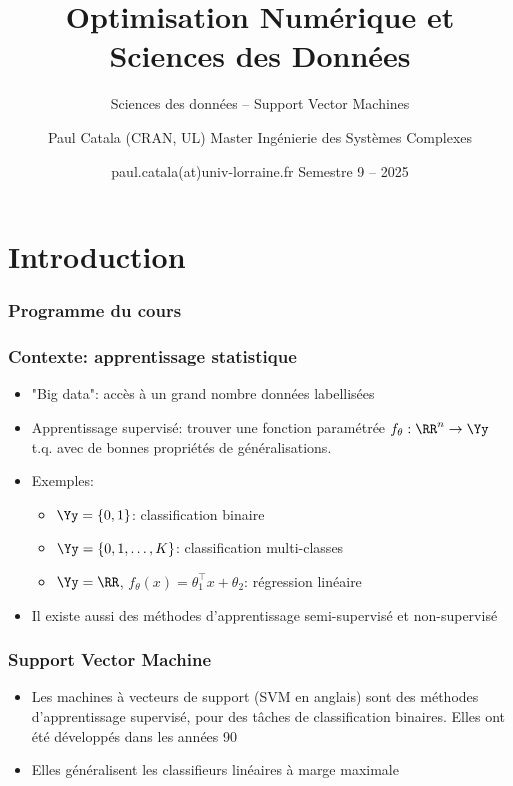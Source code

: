 \documentclass[9pt,table]{beamer} %
\title{Optimisation Numérique et Sciences des Données}
\subtitle{Sciences des données -- Support Vector Machines}
\author{Paul Catala (CRAN, UL) \hfill Master Ingénierie des Systèmes Complexes}
\date{paul.catala(at)univ-lorraine.fr \hfill Semestre 9 -- 2025 \\}
\begin{document}
\maketitle



\section{Introduction}

\begin{frame}
\frametitle{Programme du cours}
\tableofcontents[currentsection]
\end{frame}

\begin{frame}
\frametitle{Contexte: apprentissage statistique}

\begin{itemize}[label=\tiny$\blacksquare$]
	\item "Big data": accès à un grand nombre données \alert{labellisées}
	
	\item \alert{Apprentissage supervisé}: trouver une fonction \alert{paramétrée} $f_\theta : \RR^n \to \Yy$ t.q.
	avec de bonnes propriétés de généralisations.
	
	\item Exemples: 
	\begin{itemize}[label=-]
		\item $\Yy = \{0,1\}$: \alert{classification binaire}
		\item $\Yy = \{0,1,\ldots,K\}$: classification multi-classes
		\item $\Yy = \RR$, $f_{\theta}(x) = \theta_1^\top x + \theta_2$: \alert{régression linéaire}
		
	\end{itemize}
	\item Il existe aussi des méthodes d'apprentissage semi-supervisé et non-supervisé
\end{itemize}
\end{frame}


\begin{frame}
\frametitle{Support Vector Machine}

\begin{itemize}[label=\tiny$\blacksquare$]
	\item Les machines à vecteurs de support (SVM en anglais) sont des méthodes d'apprentissage supervisé, pour des tâches de classification binaires. Elles ont été développés dans les années 90
	
	\item Elles généralisent les classifieurs linéaires à marge maximale
\end{itemize}
\end{frame}
\end{document}
